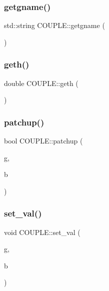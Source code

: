 \mbox{\label{class_c_o_u_p_l_e_a61f4137001b8d4f45036b13e67b0b582}} 
\subsubsection{\texorpdfstring{getgname()}{getgname()}}
{\footnotesize\ttfamily std\+::string C\+O\+U\+P\+L\+E\+::getgname (\begin{DoxyParamCaption}{ }\end{DoxyParamCaption})}

\mbox{\label{class_c_o_u_p_l_e_a02c5163d45a74f2047bc6e08e3b3faa5}} 
\subsubsection{\texorpdfstring{geth()}{geth()}}
{\footnotesize\ttfamily double C\+O\+U\+P\+L\+E\+::geth (\begin{DoxyParamCaption}{ }\end{DoxyParamCaption})}

\mbox{\label{class_c_o_u_p_l_e_a98547298545f61138f85af7dd9ac188c}} 
\subsubsection{\texorpdfstring{patchup()}{patchup()}}
{\footnotesize\ttfamily bool C\+O\+U\+P\+L\+E\+::patchup (\begin{DoxyParamCaption}\item[{\hyperlink{class_g_i_r_l}{G\+I\+RL}}]{g,  }\item[{\hyperlink{class_b_o_y}{B\+OY}}]{b }\end{DoxyParamCaption})}

\mbox{\label{class_c_o_u_p_l_e_acb721e44912b9318da0facbb23c2c66c}} 
\subsubsection{\texorpdfstring{set\+\_\+val()}{set\_val()}}
{\footnotesize\ttfamily void C\+O\+U\+P\+L\+E\+::set\+\_\+val (\begin{DoxyParamCaption}\item[{\hyperlink{class_g_i_r_l}{G\+I\+RL}}]{g,  }\item[{\hyperlink{class_b_o_y}{B\+OY}}]{b }\end{DoxyParamCaption})}

